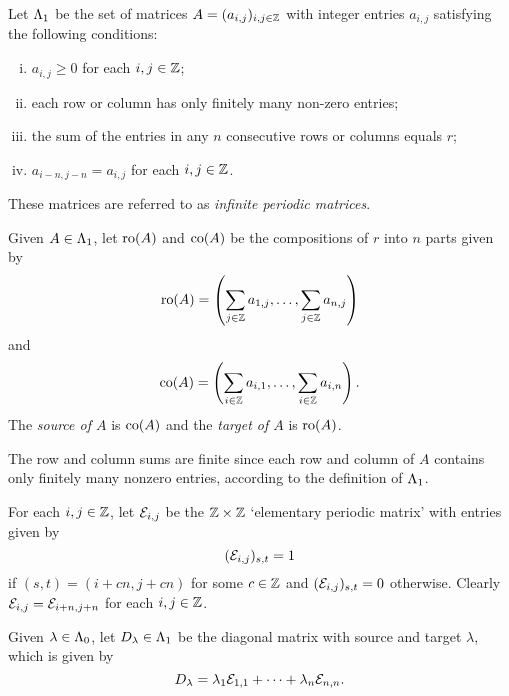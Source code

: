 \documentclass[a4paper, 11pt]{report}
\begin{document}
\begin{definition}\label{def:matrices}
Let $\Lambda_1{}$ be the set of matrices $A=(a_{i,j})_{i,j\in\mathbb{Z}}$ with integer entries $a_{i,j}$ satisfying the following conditions: 
\begin{enumerate}[i.]
\item
$a_{i,j}\geq 0$ for each $i,j\in\mathbb{Z}$;
\item
each row or column has only finitely many non-zero entries;
\item
the sum of the entries in any $n$ consecutive rows or columns equals $r$;
\item
$a_{i-n,j-n}=a_{i,j}$ for each $i,j\in\mathbb{Z}$.
\end{enumerate}
These matrices are referred to as \emph{infinite periodic matrices}.
\end{definition}

\begin{definition}\label{def:source-target}
Given $A\in\Lambda_1{}$, let $\operatorname{ro}(A)$ and $\operatorname{co}(A)$ be the compositions of $r$ into $n$ parts given by
\begin{equation*}
\operatorname{ro}(A) = \left( \sum_{j\in\mathbb{Z}}a_{1,j}, \ldots, \sum_{j\in\mathbb{Z}} a_{n,j}\right)
\end{equation*}
and
\begin{equation*}
\operatorname{co}(A) = \left( \sum_{i\in\mathbb{Z}} a_{i,1}, \ldots, \sum_{i\in\mathbb{Z}} a_{i,n}\right).
\end{equation*}
The \emph{source of $A$} is $\operatorname{co}(A)$ and the \emph{target of $A$} is $\operatorname{ro}(A)$.
\end{definition}

The row and column sums are finite since each row and column of $A$ contains only finitely many nonzero entries, according to the definition of $\Lambda_1{}$.

	For each $i,j\in\mathbb{Z}$, let $\mathcal{E}_{i,j}$ be the $\mathbb{Z}\times\mathbb{Z}$ `elementary periodic matrix' with entries given by
\begin{equation*}
(\mathcal{E}_{i,j})_{s,t}=1
\end{equation*}
if $(s,t) = (i+cn,j+cn)$ for some $c\in\mathbb{Z}$ and $(\mathcal{E}_{i,j})_{s,t}=0$ otherwise. Clearly $\mathcal{E}_{i,j} = \mathcal{E}_{i+n,j+n}$ for each $i,j\in\mathbb{Z}$.

Given $\lambda\in\Lambda_0{}$, let $D_{\lambda}\in\Lambda_1{}$ be the diagonal matrix with source and target $\lambda$, which is given by 
\begin{equation}\label{eq:diagonal-matrices}
D_{\lambda} = \lambda_1\mathcal{E}_{1,1} +\cdots +\lambda_n\mathcal{E}_{n,n}.
\end{equation}
\end{document}
